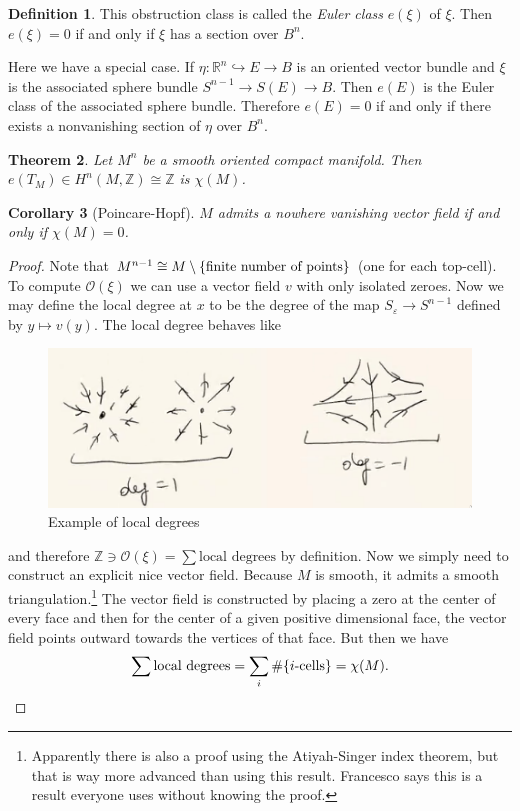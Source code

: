 \documentclass[leqno, openany]{memoir}
\newtheorem{thm}{Theorem}[section]
\newtheorem{cor}[thm]{Corollary}
\theoremstyle{definition}
\newtheorem{defn}[thm]{Definition}
\theoremstyle{remark}
\theoremstyle{plain}
\theoremstyle{definition}
\theoremstyle{remark}
\newcommand{\R}{\mathbb{R}}
\newcommand{\Z}{\mathbb{Z}}
\newcommand{\ep}{\varepsilon}
\newcommand{\mc}[1]{\mathcal{#1}}
\begin{document}
\begin{defn}
    This obstruction class is called the \textit{Euler class} $e(\xi)$ of $\xi$. Then $e(\xi) = 0$ if and only if $\xi$ has a section over $B^n$.
\end{defn}

Here we have a special case. If $\eta \colon \R^n \hookrightarrow E \to B$ is an oriented vector bundle and $\xi$ is the associated sphere bundle $S^{n-1} \to S(E) \to B$. Then $e(E)$ is the Euler class of the associated sphere bundle. Therefore $e(E) = 0$ if and only if there exists a nonvanishing section of $\eta$ over $B^n$.

\begin{thm}
    Let $M^n$ be a smooth oriented compact manifold. Then $e(T_M) \in H^n(M, \Z) \cong \Z$ is $\chi(M)$.
\end{thm}

\begin{cor}[Poincare-Hopf]
    $M$ admits a nowhere vanishing vector field if and only if $\chi(M) = 0$.
\end{cor}

\begin{proof}
    Note that $M^{n-1} \cong M \setminus \qty{\text{finite number of points}}$ (one for each top-cell). To compute $\mc{O}(\xi)$ we can use a vector field $v$ with only isolated zeroes. Now we may define the local degree at $x$ to be the degree of the map $S_{\ep} \to S^{n-1}$ defined by $y \mapsto v(y)$. The local degree behaves like 
    \begin{figure}[H]
        \centering
        \includegraphics[width=0.8\linewidth]{locdeg}
        \caption{Example of local degrees}%
        \label{fig:locdeg}
    \end{figure}
    and therefore $\Z \ni \mc{O}(\xi) = \sum \text{local degrees}$ by definition. Now we simply need to construct an explicit nice vector field. Because $M$ is smooth, it admits a smooth triangulation.\footnote{Apparently there is also a proof using the Atiyah-Singer index theorem, but that is way more advanced than using this result. Francesco says this is a result everyone uses without knowing the proof.} The vector field is constructed by placing a zero at the center of every face and then for the center of a given positive dimensional face, the vector field points outward towards the vertices of that face. But then we have
    \[ \sum \text{local degrees} = \sum_i \#\qty{\text{$i$-cells}} = \chi(M). \qedhere \]
\end{proof}
\end{document}
